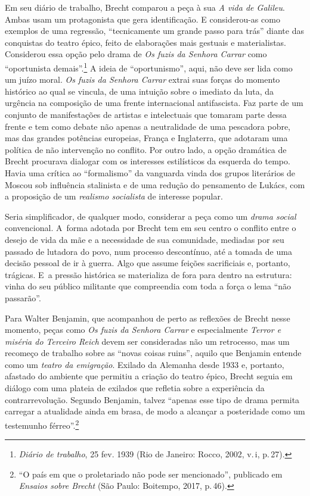 {Em seu diário de trabalho, Brecht comparou a peça à sua {\it A vida de
Galileu}. Ambas usam um protagonista que gera identificação. E
considerou-as como exemplos de uma regressão, “tecnicamente um grande
passo para trás” diante das conquistas do teatro épico, feito de
elaborações mais gestuais e materialistas. Considerou essa opção pelo
drama de {\it Os fuzis da Senhora Carrar} como “oportunista
demais”.\footnote{{\it Diário de trabalho}, 25 fev. 1939 (Rio de Janeiro:
  Rocco, 2002, v.\,{\sc i}, p.\,27).} A ideia de “oportunismo”, aqui, não deve
ser lida como um juízo moral. {\it Os fuzis da Senhora Carrar} extrai
suas forças do momento histórico ao qual se vincula, de uma intuição
sobre o imediato da luta, da urgência na composição de uma frente
internacional antifascista. Faz parte de um conjunto de manifestações de
artistas e intelectuais que tomaram parte dessa frente e tem como debate
não apenas a neutralidade de uma pescadora pobre, mas das grandes
potências europeias, França e Inglaterra, que adotaram uma política de
não intervenção no conflito. Por outro lado, a opção dramática de Brecht
procurava dialogar com os interesses estilísticos da esquerda do tempo.
Havia uma crítica ao “formalismo” da vanguarda vinda dos grupos
literários de Moscou sob influência stalinista e de uma redução do
pensamento de Lukács, com a proposição de um {\it realismo socialista}
de interesse popular.

Seria simplificador, de qualquer modo, considerar a peça como um
{\it drama social} convencional. A~forma adotada por Brecht tem em seu centro 
o conflito entre o desejo de vida da mãe e a necessidade de sua
comunidade, mediadas por seu passado de lutadora do povo, num processo
descontínuo, até a tomada de uma decisão pessoal de ir à guerra. Algo
que assume feições sacrificiais e, portanto, trágicas. E~a pressão
histórica se materializa de fora para dentro na estrutura: vinha do seu
público militante que compreendia com toda a força o lema “não
passarão”.

Para Walter Benjamin, que acompanhou de perto as reflexões de Brecht
nesse momento, peças como {\it Os fuzis da Senhora Carrar} e
especialmente {\it Terror e miséria do Terceiro Reich} devem ser
consideradas não um retrocesso, mas um recomeço de trabalho sobre as
“novas coisas ruins”, aquilo que Benjamin entende como um {\it teatro da
emigração}. Exilado da Alemanha desde 1933 e, portanto, afastado do
ambiente que permitiu a criação do teatro épico, Brecht seguia em
diálogo com uma plateia de exilados que refletia sobre a experiência da
contrarrevolução. Segundo Benjamin, talvez “apenas esse tipo de drama
permita carregar a atualidade ainda em brasa, de modo a alcançar a
posteridade como um testemunho férreo”.\footnote{“O país em que o
  proletariado não pode ser mencionado”, publicado em {\it Ensaios sobre
  Brecht} (São Paulo: Boitempo, 2017, p.\,46).}

}
